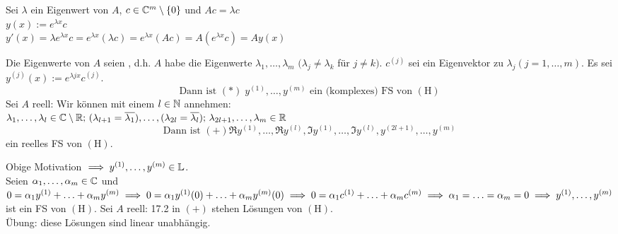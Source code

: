 \documentclass{article}
\begin{document}
\begin{motivation}
Sei $\lambda$ ein Eigenwert von $A$, $c \in \mathbb{C}^m\setminus\{0\}$ und $Ac = \lambda c$ \\
$y(x) := e^{\lambda x}c$\\
$y'(x) = \lambda e^{\lambda x}c = e^{\lambda x}(\lambda c) = e^{\lambda x}(Ac) = A(e^{\lambda x}c) = Ay(x)$
\vspace{1em}
\end{motivation}

\begin{satz} %
Die Eigenwerte von $A$ seien , d.h. $A$ habe die Eigenwerte $\lambda_1, \ldots, \lambda_m$
$(\lambda_j \neq \lambda_k$ für $j \neq k)$. $c^{(j)}$ sei ein Eigenvektor zu $\lambda_j (j=1,\ldots,m)$. Es sei $y^{(j)}(x):=e^{\lambda jx}c^{(j)}.$ 
$$\text{Dann ist } (*) \; y^{(1)}, \ldots, y^{(m)} \text{ ein (komplexes) FS von } (\text{H}) $$
Sei $A$ reell: Wir können mit einem $l \in \mathbb{N}$ annehmen: \\
$\lambda_1, \ldots, \lambda_l \in \mathbb{C} \setminus \mathbb{R}; \, (\lambda_{l+1} = \overline{\lambda_1}), \ldots, (\lambda_{2l} = \overline{\lambda_l}); \, \lambda_{2l+1}, \ldots, \lambda_m \in \mathbb{R}$ \\
$$\text{Dann ist } (+) \Re y^{(1)}, \ldots, \Re y^{(l)}, \Im y^{(1)}, \ldots, \Im y^{(l)}, y^{(2l+1)}, \ldots, y^{(m)}$$ ein reelles FS von $(\text{H})$.
\end{satz}


\begin{beweis}
Obige Motivation $\implies y^{(1)}, \ldots, y^{(m)} \in \mathbb{L}$. \\
Seien $\alpha_1, \ldots, \alpha_m \in \mathbb{C}$ und $0 = \alpha_1 y^{(1)} + \ldots + \alpha_m y^{(m)} \\
\implies 0 = \alpha_1 y^{(1)}(0) + \ldots + \alpha_m y^{(m)}(0) \implies 0 = \alpha_1 c^{(1)} + \ldots + \alpha_m c^{(m)} \\
\implies \alpha_1 = \ldots = \alpha_m = 0 \implies y^{(1)}, \ldots, y^{(m)}$ ist ein FS von $(\text{H})$. Sei $A$ reell: 17.2 \folgt in $(+)$ stehen Lösungen von $(\text{H})$.\\
Übung: diese Lösungen sind linear unabhängig.
\end{beweis}
\end{document}
